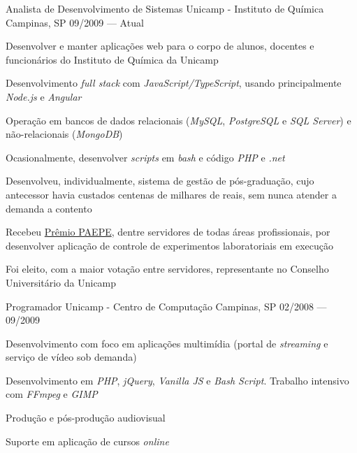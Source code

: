 

\begin{cventries}

  \cventry
    {Analista de Desenvolvimento de Sistemas} %
    {Unicamp - Instituto de Química} %
    {Campinas, SP} %
    {09/2009 — Atual} %
    {
      \begin{cvitems} %
        \item {Desenvolver e manter aplicações web para o corpo de alunos, docentes e funcionários do Instituto de Química da Unicamp}
        \item {Desenvolvimento \textit{full stack} com \textit{JavaScript/TypeScript}, usando principalmente \textit{Node.js} e \textit{Angular}}
        \item {Operação em bancos de dados relacionais (\textit{MySQL}, \textit{PostgreSQL} e \textit{SQL Server}) e não-relacionais (\textit{MongoDB})}
        \item {Ocasionalmente, desenvolver \textit{scripts} em \textit{bash} e código \textit{PHP} e \textit{.net}}
        \item {Desenvolveu, individualmente, sistema de gestão de pós-graduação, cujo antecessor havia custados centenas de milhares de reais, sem nunca atender a demanda a contento}
        \item {Recebeu \href{https://www.dgrh.unicamp.br/premiopaepe}{Prêmio PAEPE}, dentre servidores de todas áreas profissionais, por desenvolver aplicação de controle de experimentos laboratoriais em execução}
        \item {Foi eleito, com a maior votação entre servidores, representante no Conselho Universitário da Unicamp}
      \end{cvitems}
    }

  \cventry
    {Programador} %
    {Unicamp - Centro de Computação} %
    {Campinas, SP} %
    {02/2008 — 09/2009} %
    {
      \begin{cvitems} %
        \item {Desenvolvimento com foco em aplicações multimídia (portal de \textit{streaming} e serviço de vídeo sob demanda)}
        \item {Desenvolvimento em \textit{PHP}, \textit{jQuery}, \textit{Vanilla JS} e \textit{Bash Script}. Trabalho intensivo com \textit{FFmpeg} e \textit{GIMP}}
        \item {Produção e pós-produção audiovisual}
        \item {Suporte em aplicação de cursos \textit{online}}
      \end{cvitems}
    }

\end{cventries}
